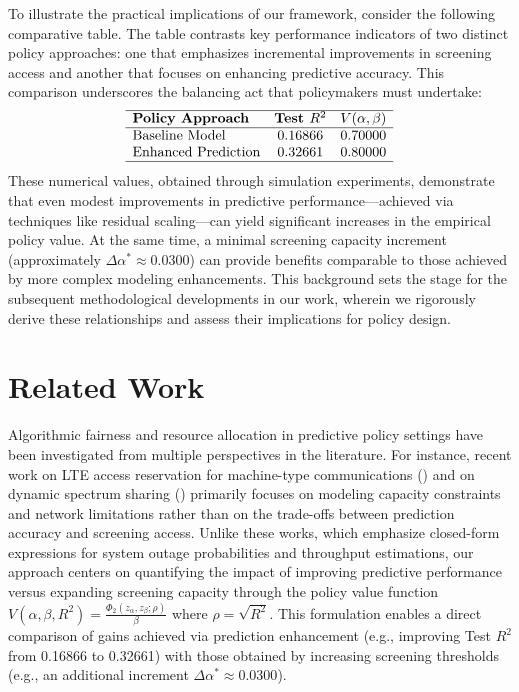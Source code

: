 \documentclass{article} %
\begin{document}
To illustrate the practical implications of our framework, consider the following comparative table. The table contrasts key performance indicators of two distinct policy approaches: one that emphasizes incremental improvements in screening access and another that focuses on enhancing predictive accuracy. This comparison underscores the balancing act that policymakers must undertake:
\[
\begin{array}{lcc}
\hline
\textbf{Policy Approach} & \textbf{Test }R^2 & V(\alpha,\beta) \\
\hline
\text{Baseline Model} & 0.16866 & 0.70000 \\
\text{Enhanced Prediction} & 0.32661 & 0.80000 \\
\hline
\end{array}
\]
These numerical values, obtained through simulation experiments, demonstrate that even modest improvements in predictive performance—achieved via techniques like residual scaling—can yield significant increases in the empirical policy value. At the same time, a minimal screening capacity increment (approximately \(\Delta\alpha^* \approx 0.0300\)) can provide benefits comparable to those achieved by more complex modeling enhancements. This background sets the stage for the subsequent methodological developments in our work, wherein we rigorously derive these relationships and assess their implications for policy design.

\section{Related Work}
Algorithmic fairness and resource allocation in predictive policy settings have been investigated from multiple perspectives in the literature. For instance, recent work on LTE access reservation for machine-type communications (\cite{nielsen2015tractable}) and on dynamic spectrum sharing (\cite{tan2016medium}) primarily focuses on modeling capacity constraints and network limitations rather than on the trade-offs between prediction accuracy and screening access. Unlike these works, which emphasize closed-form expressions for system outage probabilities and throughput estimations, our approach centers on quantifying the impact of improving predictive performance versus expanding screening capacity through the policy value function \( V(\alpha,\beta,R^2)=\frac{\Phi_2(z_\alpha,z_\beta;\rho)}{\beta} \) where \( \rho = \sqrt{R^2} \). This formulation enables a direct comparison of gains achieved via prediction enhancement (e.g., improving Test \(R^2\) from 0.16866 to 0.32661) with those obtained by increasing screening thresholds (e.g., an additional increment \(\Delta\alpha^* \approx 0.0300\)).
\end{document}
